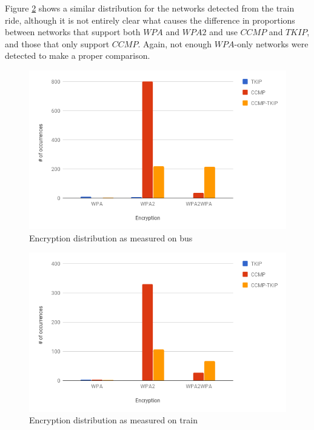 \documentclass[letterpaper, 10 pt, conference]{ieeeconf}  %
\begin{document}
Figure \ref{fig:traincipher} shows a similar distribution for the networks detected from the train ride, although it is not entirely clear what causes the difference in proportions between networks that support both $WPA$ and $WPA2$ and use $CCMP$ and $TKIP$, and those that only support $CCMP$. Again, not enough $WPA$-only networks were detected to make a proper comparison.



\begin{figure}[h]
\includegraphics[scale=0.4]{Figures/CipherBus.png}
\caption{Encryption distribution as measured on bus}
\label{fig:buscipher}
\end{figure}


\begin{figure}[h]
\includegraphics[scale=0.4]{Figures/CipherTrain.png}
\caption{Encryption distribution as measured on train}
\label{fig:traincipher}
\end{figure}
\end{document}
